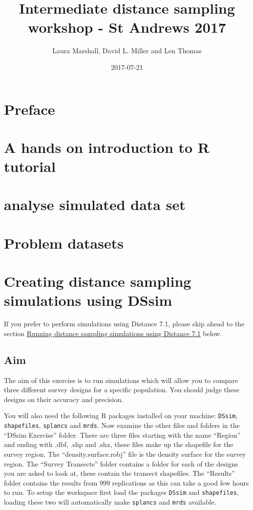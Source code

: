 \documentclass[]{book}
\title{Intermediate distance sampling workshop - St Andrews 2017}
\author{Laura Marshall, David L. Miller and Len Thomas}
\date{2017-07-21}
\theoremstyle{definition}
\theoremstyle{definition}
\theoremstyle{remark}
\begin{document}
\maketitle

{
\hypersetup{linkcolor=black}
\setcounter{tocdepth}{1}
\tableofcontents
}
\chapter*{Preface}\label{preface}

\chapter{A hands on introduction to R
tutorial}\label{a-hands-on-introduction-to-r-tutorial}

\chapter{analyse simulated data set}\label{analyse-simulated-data-set}

\chapter{Problem datasets}\label{problem-datasets}

\chapter{Creating distance sampling simulations using
DSsim}\label{creating-distance-sampling-simulations-using-dssim}

If you prefer to perform simulations using Distance 7.1, please skip
ahead to the section
\protect\hyperlink{running-distance-sampling-simulations-using-distance-7.1}{Running
distance sampling simulations using Distance 7.1} below.

\section{Aim}\label{aim}

The aim of this exercise is to run simulations which will allow you to
compare three different survey designs for a specific population. You
should judge these designs on their accuracy and precision.

You will also need the following R packages installed on your machine:
\texttt{DSsim}, \texttt{shapefiles}, \texttt{splancs} and \texttt{mrds}.
Now examine the other files and folders in the ``DSsim Exercise''
folder. There are three files starting with the name ``Region'' and
ending with .dbf, .shp and .shx, these files make up the shapefile for
the survey region. The ``density.surface.robj'' file is the density
surface for the survey region. The ``Survey Transects'' folder contains
a folder for each of the designs you are asked to look at, these contain
the transect shapefiles. The ``Results'' folder contains the results
from 999 replications as this can take a good few hours to run. To setup
the workspace first load the packages \texttt{DSsim} and
\texttt{shapefiles}, loading these two will automatically make
\texttt{splancs} and \texttt{mrds} available.
\end{document}
